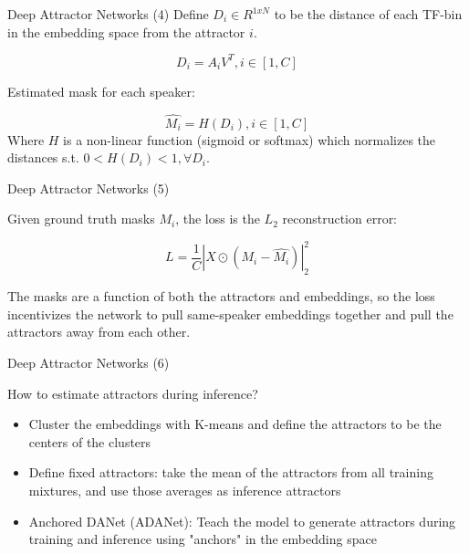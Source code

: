 \documentclass[11pt]{beamer}
\begin{document}
\begin{frame}{Deep Attractor Networks (4)}
Define $D_i \in R^{1xN}$ to be the distance of each TF-bin in the embedding space from the attractor $i$.

\begin{equation}
D_i = A_iV^T, i \in [1,C]
\end{equation}

Estimated mask for each speaker:

\begin{equation}
\hat{M_{i}} = H(D_i), i \in [1,C]
\end{equation}
Where $H$ is a non-linear function (sigmoid or softmax) which normalizes the distances s.t. $0 < H(D_i) < 1,     \forall D_i$.
\end{frame}

\begin{frame}{Deep Attractor Networks (5)}

Given ground truth masks $M_i$, the loss is the $L_2$ reconstruction error:

\begin{equation}
L = \frac{1}{C} |X \odot (M_i - \hat{M_{i}})|^2_2
\end{equation}

The masks are a function of both the attractors and embeddings, so the loss incentivizes the network to pull same-speaker embeddings together and pull the attractors away from each other.

\end{frame}

\begin{frame}{Deep Attractor Networks (6)}

How to estimate attractors during inference?
\linebreak	
\begin{itemize}
\item Cluster the embeddings with K-means and define the attractors to be the centers of the clusters
\item Define fixed attractors: take the mean of the attractors from all training mixtures, and use those averages as inference attractors
\item Anchored DANet (ADANet): Teach the model to generate attractors during training and inference using "anchors" in the embedding space
\end{itemize}

\end{frame}
\end{document}
